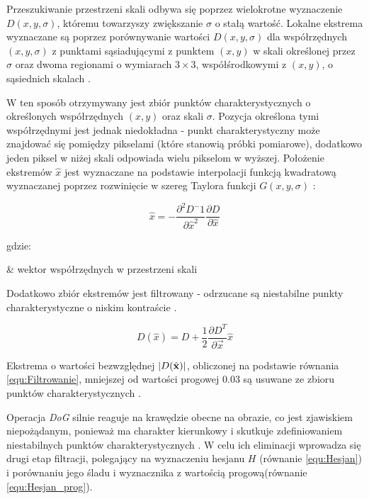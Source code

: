 Przeszukiwanie przestrzeni skali odbywa się poprzez wielokrotne wyznaczenie $D(x, y, \sigma)$, któremu towarzyszy zwiększanie $\sigma$ o stałą wartość. Lokalne ekstrema wyznaczane są poprzez porównywanie wartości $D(x, y, \sigma)$ dla współrzędnych $(x, y, \sigma)$ z punktami sąsiadującymi z punktem $(x, y)$ w skali określonej przez $\sigma$ oraz dwoma regionami o wymiarach $3 \times 3$, współśrodkowymi z $(x, y)$, o sąsiednich skalach \cite{Lowe2004}.

W ten sposób otrzymywany jest zbiór punktów charakterystycznych o określonych współrzędnych $(x, y)$ oraz skali $\sigma$. Pozycja określona tymi współrzędnymi jest jednak niedokładna - punkt charakterystyczny
może znajdować się pomiędzy pikselami (które stanowią próbki pomiarowe), dodatkowo jeden piksel w niżej skali odpowiada wielu pikselom w wyższej. Położenie ekstremów $\hat{x}$ jest wyznaczane na podstawie interpolacji funkcją kwadratową wyznaczanej poprzez rozwinięcie w szereg Taylora funkcji $G(x, y, \sigma)$ \cite{Lowe2004}:

\begin{equation}
\label{equ:Ekstrema_interpolacja}
	\hat{x} = - \frac{\partial^2 D^-1}{\partial \hat{x}^2} \frac{\partial D}{\partial \hat{x}}
\end{equation}

\noindent
gdzie:

\begin{conditions}
	 & wektor współrzędnych w przestrzeni skali
\end{conditions}

Dodatkowo zbiór ekstremów jest filtrowany - odrzucane są niestabilne punkty charakterystyczne o niskim kontraście \cite{Lowe2004}.

\begin{equation}
\label{equ:Filtrowanie}
	D(\hat{x}) = D + \frac{1}{2} \frac{\partial D^T}{\partial \vec{x}} \hat{x}
\end{equation}

Ekstrema o wartości bezwzględnej $\abs{D(\hat{x})}$, obliczonej na podstawie równania \ref{equ:Filtrowanie}, mniejszej od wartości progowej $0.03$ są usuwane ze zbioru punktów charakterystycznych \cite{Lowe2004}.

Operacja \textit{DoG} silnie reaguje na krawędzie obecne na obrazie, co jest zjawiskiem niepożądanym, ponieważ ma charakter kierunkowy i skutkuje zdefiniowaniem niestabilnych punktów charakterystycznych
\cite{Lowe2004}. W celu ich eliminacji wprowadza się drugi etap filtracji, polegający na wyznaczeniu hesjanu $H$ (równanie \ref{equ:Hesjan}) i porównaniu jego śladu i wyznacznika z wartością progową(równanie \ref{equ:Hesjan_prog}).

